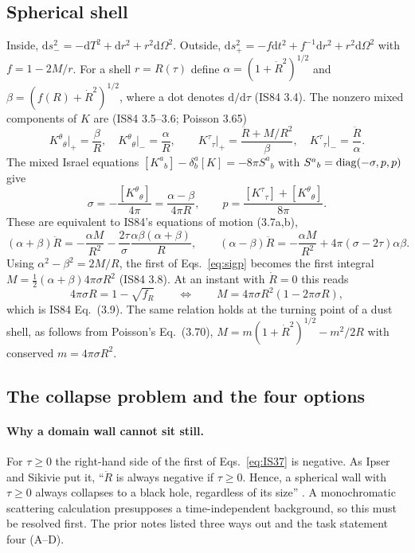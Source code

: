 \documentclass[11pt,a4paper]{article}
\numberwithin{equation}{section}
\newcommand{\sq}{\sqrt{f_R}}
\newcommand{\dd}{\mathrm{d}}
\begin{document}
\subsection{Spherical shell}
Inside, $\dd s_-^2=-\dd T^2+\dd r^2+r^2\dd\Omega^2$. Outside, $\dd s_+^2=-f\dd t^2+f^{-1}\dd r^2+r^2\dd\Omega^2$ with
$f=1-2M/r$. For a shell $r=R(\tau)$ define $\alpha=(1+\dot R^2)^{1/2}$ and $\beta=(f(R)+\dot R^2)^{1/2}$, where a dot
denotes $\dd/\dd\tau$ (IS84 3.4). The nonzero mixed components of $K$ are (IS84 3.5--3.6; Poisson 3.65)
\begin{equation}
K^\theta{}_\theta\big|_+=\frac{\beta}{R},\quad K^\theta{}_\theta\big|_-=\frac{\alpha}{R},\qquad
K^\tau{}_\tau\big|_+=\frac{\ddot R+M/R^2}{\beta},\quad K^\tau{}_\tau\big|_-=\frac{\ddot R}{\alpha}.
\label{eq:Kbg}
\end{equation}
The mixed Israel equations $[K^a{}_b]-\delta^a_b[K]=-8\pi S^a{}_b$ with $S^a{}_b={\rm diag}(-\sigma,p,p)$ give
\begin{equation}
\sigma=-\frac{[K^\theta{}_\theta]}{4\pi}=\frac{\alpha-\beta}{4\pi R},\qquad
p=\frac{[K^\tau{}_\tau]+[K^\theta{}_\theta]}{8\pi}.
\label{eq:sigp}
\end{equation}
These are equivalent to IS84's equations of motion (3.7a,b),
\begin{equation}
(\alpha+\beta)\ddot R=-\frac{\alpha M}{R^2}-\frac{2\tau}{\sigma}\frac{\alpha\beta(\alpha+\beta)}{R},\qquad
(\alpha-\beta)\ddot R=-\frac{\alpha M}{R^2}+4\pi(\sigma-2\tau)\alpha\beta .
\label{eq:IS37}
\end{equation}
Using $\alpha^2-\beta^2=2M/R$, the first of Eqs.~\eqref{eq:sigp} becomes the first integral
$M=\tfrac12(\alpha+\beta)4\pi\sigma R^2$ (IS84 3.8). At an instant with $\dot R=0$ this reads
\begin{equation}
4\pi\sigma R=1-\sq\qquad\Longleftrightarrow\qquad M=4\pi\sigma R^2(1-2\pi\sigma R),
\label{eq:IS39}
\end{equation}
which is IS84 Eq.~(3.9). The same relation holds at the turning point of a dust shell, as follows from Poisson's
Eq.~(3.70), $M=m(1+\dot R^2)^{1/2}-m^2/2R$ with conserved $m=4\pi\sigma R^2$.

\subsection{The collapse problem and the four options}\label{sec:choice}
\paragraph{Why a domain wall cannot sit still.} For $\tau\ge0$ the right-hand side of the first of
Eqs.~\eqref{eq:IS37} is negative. As Ipser and Sikivie put it, ``$\ddot R$ is always negative if $\tau\ge0$. Hence, a
spherical wall with $\tau\ge0$ always collapses to a black hole, regardless of its size'' \cite{IS84}. A monochromatic
scattering calculation presupposes a time-independent background, so this must be resolved first. The prior notes
\cite{burbuja} listed three ways out and the task statement four (A--D).
\end{document}
